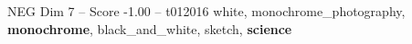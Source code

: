 \begin{textsample}{NEG Dim 7 – Score -1.00 – t012016}  \label{ex:f7_neg_040}
white, monochrome\_photography, \textbf{monochrome}, black\_and\_white, sketch, \textbf{science}

\end{textsample}
